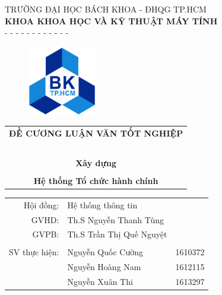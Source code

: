 \documentclass[12pt, a4paper]{report}
\begin{document}
\usetikzlibrary{calc}

\begin{titlepage}
\begin{center}
TRƯỜNG ĐẠI HỌC BÁCH KHOA - ĐHQG TP.HCM\\
\textbf{KHOA KHOA HỌC VÀ KỸ THUẬT MÁY TÍNH}\\
- - - - - - - - - - - -
\end{center}

\vspace{0.5cm}
\begin{figure}[H]
\begin{center}
\includegraphics[width=3cm]{img/LogoBK.jpg}
\end{center}
\end{figure}
\vspace{0.5cm}

\begin{center}
\begin{tabular}{c}
\multicolumn{1}{c}{\textbf{{\Large ĐỀ CƯƠNG LUẬN VĂN TỐT NGHIỆP }}}\\
~~\\
\hline
\multicolumn{1}{c}{\textbf{{\Large Xây dựng}}}\\\\
\textbf{{\Large Hệ thống Tổ chức hành chính}}\\
\hline
\end{tabular}
\end{center}

\vspace{1cm}
\begin{table}[H]
\begin{tabular}{rlr}
\hspace{5cm} Hội đồng: & Hệ thống thông tin&\\
\hspace{5cm} GVHD: & Th.S Nguyễn Thanh Tùng&\\
\hspace{5cm} GVPB: & Th.S Trần Thị Quế Nguyệt&\\
\\
\hspace{5cm} SV thực hiện: & Nguyễn Quốc Cường & 1610372\\
& Nguyễn Hoàng Nam & 1612115\\
& Nguyễn Xuân Thi & 1613297\\


\end{tabular}
\end{table}
\end{titlepage}
\end{document}
